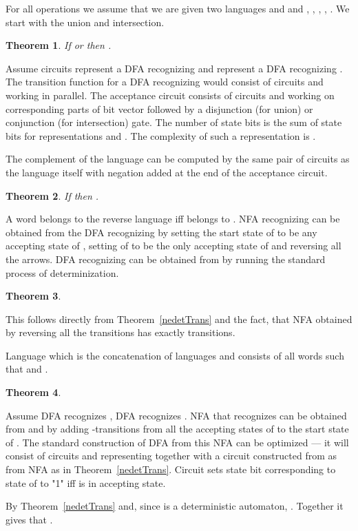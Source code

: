 \documentclass[copyright, creativecommons]{eptcs}
\newcommand{\qed}{}
\newtheorem{theorem}{Theorem}[section]
\newenvironment{proof}[1][Proof]{\begin{trivlist}
\item[\hskip \labelsep {\bfseries #1}]}{\end{trivlist}}
\begin{document}
For all operations we assume that we are given two languages  and  and ,
, , , . 
We start with the union and intersection.
\begin{theorem}
If  or  then .
\end{theorem}
\begin{proof}
Assume circuits  represent a DFA recognizing  and  represent a DFA recognizing .
The transition function for a DFA recognizing 
would consist of circuits  and  working in parallel. The acceptance circuit consists of circuits  and 
working on corresponding parts of bit vector followed by a disjunction (for union) or conjunction (for intersection) gate.
The number of state bits is the sum of state bits for representations  and .
The complexity of such a representation is .
\qed
\end{proof}

The complement of the language can be computed by the same pair of circuits as the language itself with
negation added at the end
of the acceptance circuit.
\begin{theorem}
If  then .
\end{theorem}

A word  belongs to the reverse language  iff  belongs to .
NFA  recognizing  can be obtained from the DFA  recognizing  by setting the
start state of  to be any accepting state of , setting  of  to be the only accepting state of 
and reversing all the arrows.
DFA recognizing  can be obtained from  by running the standard process of determinization. 


\begin{theorem}

\end{theorem}
\begin{proof}
This follows directly from Theorem~\ref{nedetTrans} and the fact, that NFA obtained by reversing all the
transitions has exactly  transitions.
\qed
\end{proof}

Language  which is the concatenation of languages  and  consists of all words  such that
 and .
\begin{theorem}

\end{theorem}
\begin{proof}
Assume DFA  recognizes , DFA  recognizes .
NFA that recognizes  can be obtained from  and   by adding -transitions
from all the accepting states of  to the start state of .
The standard construction of DFA from this NFA can be optimized --- it will consist of circuits  and  representing
 together with a circuit  constructed from  as from NFA as in Theorem~\ref{nedetTrans}.
Circuit  sets state bit corresponding to state  of  to "1" iff  is in accepting state.

By Theorem~\ref{nedetTrans}  and, since  is a deterministic automaton, . Together
it gives that .
\qed
\end{proof}
\end{document}
